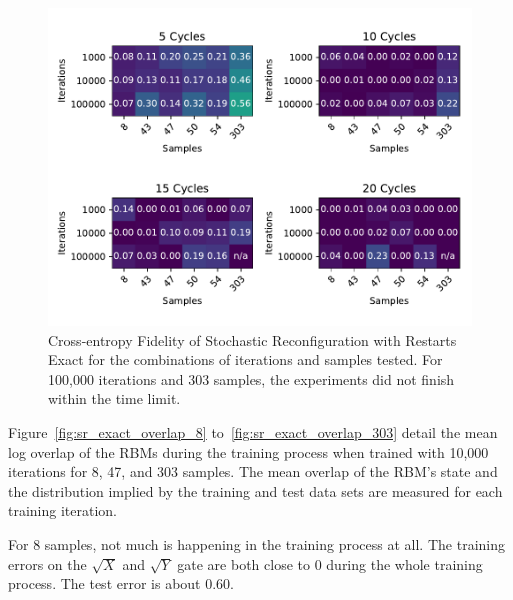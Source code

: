 \begin{figure}[H]
  \centering
  \includegraphics[width=\textwidth]{figures/results/SR-restarts-not-learned/fxeb_heatmap.pdf}
  \caption[Cross-entropy Fidelity of Stochastic Reconfiguration with Restarts Exact]{Cross-entropy Fidelity of Stochastic 
  Reconfiguration with Restarts Exact for the combinations of iterations and samples tested.
  For 100,000 iterations and 303 samples, the experiments did not finish within the time limit.}
  \label{fig:sr_tvd}
\end{figure}

Figure~\ref{fig:sr_exact_overlap_8} to~\ref{fig:sr_exact_overlap_303} detail the mean log overlap of the RBMs during the 
training process when trained with 10,000 iterations for 8, 47, and 303 samples. The 
mean overlap of the RBM's state and the distribution implied by the training and test data sets are measured 
for each training iteration.

For 8 samples, not much is happening in the training process at all. The training errors on the $\sqrt{X}$ and 
$\sqrt{Y}$ gate are both close to 0 during the whole training process. The test error is about 0.60.

